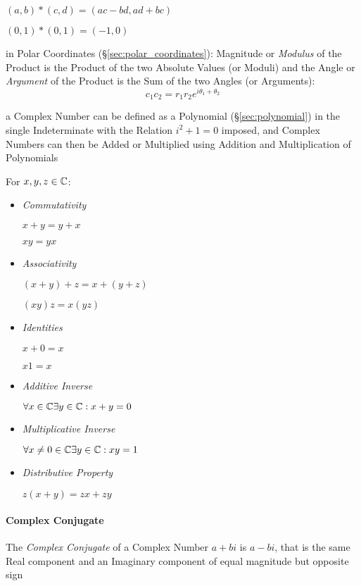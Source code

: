 $(a,b)*(c,d) = (ac - bd, ad + bc)$

$(0,1)*(0,1) = (-1, 0)$

in Polar Coordinates (\S\ref{sec:polar_coordinates}): Magnitude or
\emph{Modulus} of the Product is the Product of the two Absolute
Values (or Moduli) and the Angle or \emph{Argument} of the Product is
the Sum of the two Angles (or Arguments):
\[
  c_1 c_2 = r_1 r_2 e^{i\theta_1 + \theta_2}
\]

a Complex Number can be defined as a Polynomial (\S\ref{sec:polynomial}) in the
single Indeterminate with the Relation $i^2 + 1 = 0$ imposed, and Complex
Numbers can then be Added or Multiplied using Addition and Multiplication of
Polynomials



For $x,y,z \in \mathbb{C}$:
\begin{itemize}
\item \emph{Commutativity}

$x + y = y + x$

$xy = yx$


\item \emph{Associativity}

$(x + y) + z = x + (y + z)$

$(xy)z = x(yz)$


\item \emph{Identities}

$x + 0 = x$

$x1 = x$


\item \emph{Additive Inverse}

$\forall x \in \mathbb{C} \exists y \in \mathbb{C} : x + y = 0$


\item \emph{Multiplicative Inverse}

$\forall x \neq 0 \in \mathbb{C} \exists y \in \mathbb{C} : xy = 1$


\item \emph{Distributive Property}

$z (x + y) = zx + zy$

\end{itemize}



\paragraph{Complex Conjugate}\label{sec:complex_conjugate}\hfill

The \emph{Complex Conjugate} of a Complex Number $a + bi$ is $a - bi$, that is
the same Real component and an Imaginary component of equal magnitude but
opposite sign

